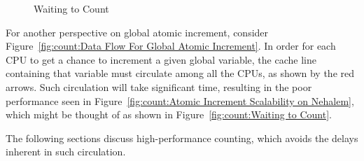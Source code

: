 \begin{figure}[tb]
\begin{center}
\end{center}
\caption{Waiting to Count}
\end{figure}

For another perspective on global atomic increment, consider
Figure~\ref{fig:count:Data Flow For Global Atomic Increment}.
In order for each CPU to get a chance to increment a given
global variable, the cache line containing that variable must
circulate among all the CPUs, as shown by the red arrows.
Such circulation will take significant time, resulting in
the poor performance seen in
Figure~\ref{fig:count:Atomic Increment Scalability on Nehalem},
which might be thought of as shown in
Figure~\ref{fig:count:Waiting to Count}.

The following sections discuss high-performance counting, which
avoids the delays inherent in such circulation.

